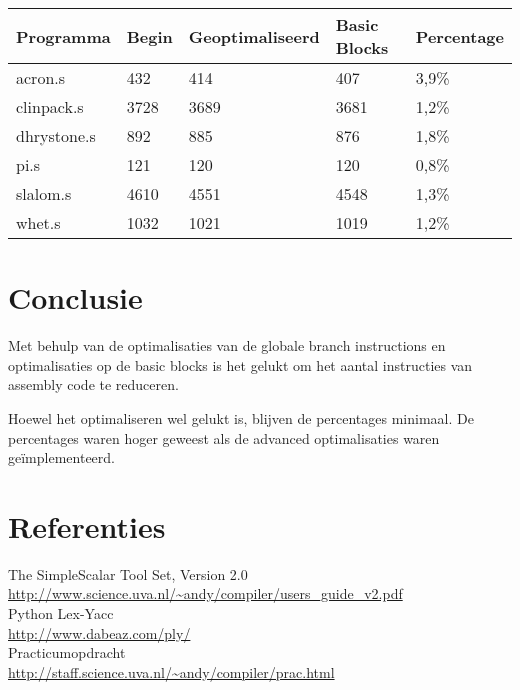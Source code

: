 \documentclass[11pt]{article}
\begin{document}
\begin{tabular}{|l|l|l|l|l|}
\hline
Programma & Begin & Geoptimaliseerd & Basic Blocks & Percentage\\
\hline
acron.s     & 432  & 414  & 407  & 3,9\%\\
clinpack.s  & 3728 & 3689 & 3681 & 1,2\%\\
dhrystone.s & 892  & 885  & 876  & 1,8\%\\
pi.s        & 121  & 120  & 120  & 0,8\%\\
slalom.s    & 4610 & 4551 & 4548 & 1,3\%\\
whet.s      & 1032 & 1021 & 1019 & 1,2\%\\
\hline
\end{tabular}

\section{Conclusie}
Met behulp van de optimalisaties van de globale branch instructions en 
optimalisaties op de basic blocks is het gelukt om het aantal instructies
van assembly code te reduceren.

Hoewel het optimaliseren wel gelukt is, blijven de percentages minimaal. 
De percentages waren hoger geweest als de advanced optimalisaties waren
ge\"{i}mplementeerd.

\section{Referenties}

The SimpleScalar Tool Set, Version 2.0\\
\url{http://www.science.uva.nl/~andy/compiler/users_guide_v2.pdf}\\
Python Lex-Yacc\\
\url{http://www.dabeaz.com/ply/}\\
Practicumopdracht\\
\url{http://staff.science.uva.nl/~andy/compiler/prac.html}
\end{document}
